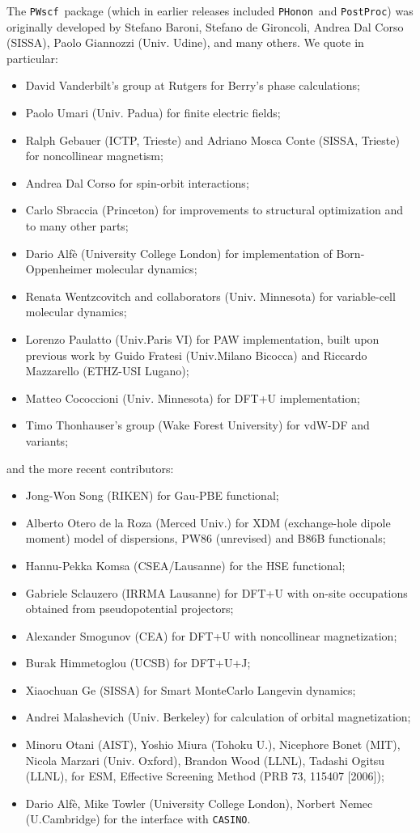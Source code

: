 \documentclass[12pt,a4paper]{article}
\def\PWscf{\texttt{PWscf}}
\def\PHonon{\texttt{PHonon}}
\def\PostProc{\texttt{PostProc}}
\begin{document}
The \PWscf\ package (which in earlier releases included
\PHonon\ and \PostProc)
was originally developed by Stefano Baroni, Stefano
de Gironcoli, Andrea Dal Corso (SISSA), Paolo Giannozzi (Univ. Udine), 
and many others. We quote in particular:
\begin{itemize}
  \item David Vanderbilt's group at Rutgers for Berry's phase
  calculations;
  \item Paolo Umari (Univ. Padua) for finite electric fields;
  \item Ralph Gebauer (ICTP, Trieste) and Adriano Mosca Conte
  (SISSA, Trieste) for noncollinear magnetism;
  \item Andrea Dal Corso for spin-orbit interactions;
  \item Carlo Sbraccia (Princeton) for improvements to structural
  optimization and to many other parts;
  \item Dario Alf\`e (University College London) for implementation
  of Born-Oppenheimer molecular dynamics;
  \item Renata Wentzcovitch and collaborators (Univ. Minnesota)
  for variable-cell molecular dynamics;
  \item Lorenzo Paulatto (Univ.Paris VI) for PAW implementation, 
  built upon previous work by Guido Fratesi (Univ.Milano Bicocca)
  and Riccardo Mazzarello (ETHZ-USI Lugano);
  \item Matteo Cococcioni (Univ. Minnesota) for DFT+U implementation;
  \item Timo Thonhauser's group (Wake Forest University) for vdW-DF and
  variants;
\end{itemize}
and the more recent contributors:
\begin{itemize}
  \item Jong-Won Song (RIKEN) for Gau-PBE functional;
  \item Alberto Otero de la Roza (Merced Univ.) for XDM (exchange-hole 
   dipole moment) model of dispersions, PW86 (unrevised) and B86B functionals;
  \item Hannu-Pekka Komsa (CSEA/Lausanne) for the HSE functional;
  \item Gabriele Sclauzero (IRRMA Lausanne) for DFT+U
        with on-site occupations obtained from pseudopotential projectors;
  \item Alexander Smogunov (CEA) for DFT+U with noncollinear magnetization;
  \item Burak Himmetoglou (UCSB) for DFT+U+J;
  \item Xiaochuan Ge (SISSA) for Smart MonteCarlo Langevin dynamics;
  \item Andrei Malashevich (Univ. Berkeley) for calculation of orbital
        magnetization;
  \item Minoru Otani (AIST), Yoshio Miura (Tohoku U.), 
        Nicephore Bonet (MIT), Nicola Marzari (Univ. Oxford), 
        Brandon Wood (LLNL), Tadashi Ogitsu (LLNL), for ESM,
        Effective Screening Method (PRB 73, 115407 [2006]);
  \item Dario Alf\`e, Mike Towler (University College London), 
        Norbert Nemec (U.Cambridge) for the interface with \texttt{CASINO}.
\end{itemize}
\end{document}
